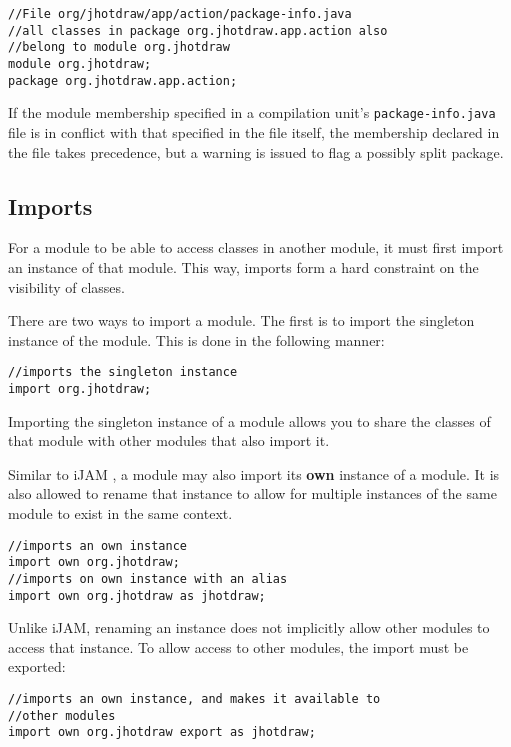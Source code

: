 \begin{lstlisting}
//File org/jhotdraw/app/action/package-info.java
//all classes in package org.jhotdraw.app.action also
//belong to module org.jhotdraw
module org.jhotdraw;
package org.jhotdraw.app.action;
\end{lstlisting}

If the module membership specified in a compilation unit's {\tt package-info.java}
file is in conflict with that specified in the file itself, the membership
declared in the file takes precedence, but a warning is issued to flag a possibly
split package.

\subsection{Imports}

For a module to be able to access classes in another module,
it must first import an instance of that module. This way, imports form
a hard constraint on the visibility of classes.

There are two ways to import a module. The first is to import the singleton
instance of the module. This is done in the following manner:

\begin{lstlisting}
//imports the singleton instance
import org.jhotdraw;
\end{lstlisting}

Importing the singleton instance of a module allows you to share the classes
of that module with other modules that also import it.

Similar to iJAM \cite{iJAM}, a module may also import its \textbf{own} instance of
a module. It is also allowed to rename that instance to allow for multiple
instances of the same module to exist in the same context.

\begin{lstlisting}
//imports an own instance
import own org.jhotdraw;
//imports on own instance with an alias
import own org.jhotdraw as jhotdraw;
\end{lstlisting}

Unlike iJAM, renaming an instance does not implicitly allow other
modules to access that instance. To allow access to other modules, the import
must be exported:

\begin{lstlisting}
//imports an own instance, and makes it available to
//other modules
import own org.jhotdraw export as jhotdraw;
\end{lstlisting}

